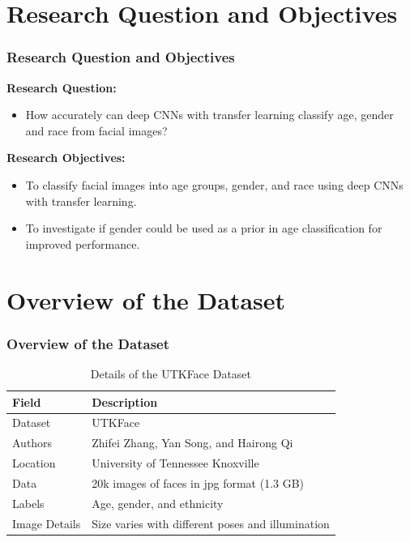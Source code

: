 \documentclass[aspectratio=169]{beamer}
\begin{document}
\section{Research Question and Objectives}
\begin{frame}
\frametitle{Research Question and Objectives}
\textbf {Research Question:}
\begin{itemize}
    \item How accurately can deep CNNs with transfer learning classify age, gender and race from facial images?
\end{itemize}
\vfill 
\textbf {Research Objectives:}
\begin{itemize}
    \item To classify facial images into age groups, gender, and race using deep CNNs with transfer learning.
    \item To investigate if gender could be used as a prior in age classification for improved performance.
\end{itemize}
\end{frame}


\section{Overview of the Dataset}
\begin{frame}
\frametitle{Overview of the Dataset}
\begin{table}[h]
\centering
\begin{tabular}{|l|l|}
\hline
\textbf{Field}     & \textbf{Description} \\ \hline
Dataset            & UTKFace               \\ \hline
Authors            & Zhifei Zhang, Yan Song, and Hairong Qi \\ \hline
Location           & University of Tennessee Knoxville \\ \hline
Data               & 20k images of faces in jpg format (1.3 GB) \\ \hline
Labels             & Age, gender, and ethnicity \\ \hline
Image Details      & Size varies with different poses and illumination \\ \hline
\end{tabular}
\caption{Details of the UTKFace Dataset}
\end{table}
\end{frame}
\end{document}
